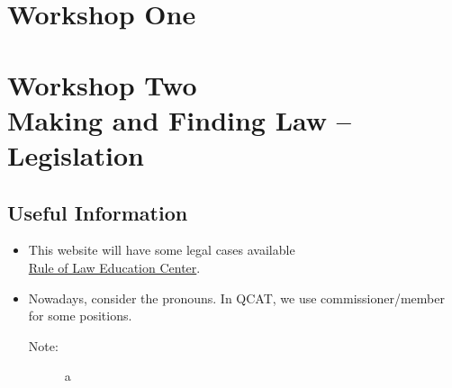 \section*{Workshop One}


\section*{Workshop Two \\ Making and Finding Law -- Legislation}
\date{March. 12th, 2024}

\subsection*{Useful Information}
\begin{itemize}
    \item This website will have some legal cases available\\ \href{https://www.ruleoflaw.org.au/}{Rule of Law Education Center}.
    \item Nowadays, consider the pronouns. In QCAT, we use commissioner/member for some positions. 
    \begin{description}
     			\item[Note:] a
         	\end{description}

\end{itemize}

